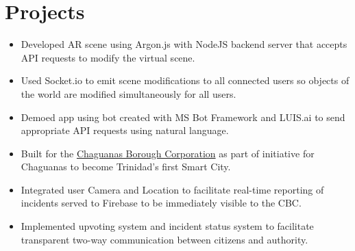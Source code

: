 \documentclass{resume}
\newcommand{\present}{$\rightarrow$}
\begin{document}
\begin{minipage}[t]{0.66\linewidth}
\section{Projects}
\begin{itemize}
    \item Developed AR scene using Argon.js with NodeJS backend server that accepts API requests to modify the virtual scene.
    \item Used Socket.io to emit scene modifications to all connected users so objects of the world are modified simultaneously for all users.
    \item Demoed app using bot created with MS Bot Framework and LUIS.ai to send appropriate API requests using natural language.
\end{itemize}
\begin{itemize}
    \item Built for the \href{http://chaguanasborough.com/}{Chaguanas Borough Corporation} as part of initiative for Chaguanas to become Trinidad's first Smart City.
    \item Integrated user Camera and Location to facilitate real-time reporting of incidents served to Firebase to be immediately visible to the CBC.
    \item Implemented upvoting system and incident status system to facilitate transparent two-way communication between citizens and authority.
\end{itemize}

\end{minipage}
\end{document}
